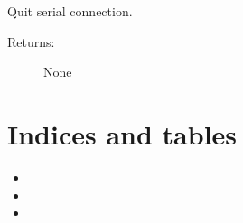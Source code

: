 \documentclass[letterpaper,10pt,english]{sphinxmanual}
\begin{document}
\begin{fulllineitems}

\begin{fulllineitems}
\label{\detokenize{QConnectBase:QConnectBase.serialclient.serial_base.SerialSocket.quit}}
\sphinxAtStartPar
Quit serial connection.
\begin{description}
\item[{Returns:}] \leavevmode
\sphinxAtStartPar
None

\end{description}

\end{fulllineitems}


\end{fulllineitems}



\chapter{Indices and tables}
\label{\detokenize{index:indices-and-tables}}\begin{itemize}
\item {} 
\sphinxAtStartPar
{}

\item {} 
\sphinxAtStartPar
{}

\item {} 
\sphinxAtStartPar
{}

\end{itemize}
\end{document}
